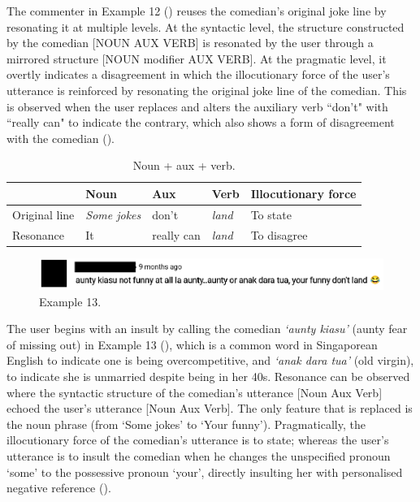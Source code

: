 \documentclass[english]{textolivre}
\begin{document}
The commenter in Example 12 () reuses the comedian’s original joke line by resonating it at multiple levels. At the syntactic level, the structure constructed by the comedian [NOUN AUX VERB] is resonated by the user through a mirrored structure [NOUN modifier AUX VERB]. At the pragmatic level, it overtly indicates a disagreement in which the illocutionary force of the user’s utterance is reinforced by resonating the original joke line of the comedian. This is observed when the user replaces and alters the auxiliary verb ``don’t" with ``really can" to indicate the contrary, which also shows a form of disagreement with the comedian ().

\begin{table}[h!]
\centering
\begin{threeparttable}
\caption{Noun + aux + verb.}\label{tab-5}
\begin{tabular}{lllll}
\toprule
& Noun & Aux & Verb & Illocutionary force \\
\midrule
Original line & \emph{Some jokes} & don’t & \emph{land} & To state \\
Resonance & It & really can & \emph{land} & To disagree \\
\bottomrule
\end{tabular}
\end{threeparttable}
\end{table}

\begin{figure}[h!]
    \centering
    \begin{minipage}{0.80\linewidth}
    \includegraphics[width=\linewidth]{imagens/exemplo13.png}
    \caption{Example 13.}\label{example-13}
    \end{minipage}
\end{figure}


The user begins with an insult by calling the comedian \textit{‘aunty kiasu’} (aunty fear of missing out) in Example 13 (), which is a common word in Singaporean English to indicate one is being overcompetitive, and \textit{‘anak dara tua’} (old virgin), to indicate she is unmarried despite being in her 40s. Resonance can be observed where the syntactic structure of the comedian’s utterance [Noun Aux Verb] echoed the user’s utterance [Noun Aux Verb]. The only feature that is replaced is the noun phrase (from ‘Some jokes’ to ‘Your funny’). Pragmatically, the illocutionary force of the comedian’s utterance is to state; whereas the user’s utterance is to insult the comedian when he changes the unspecified pronoun ‘some’ to the possessive pronoun ‘your’, directly insulting her with personalised negative reference (). 
\end{document}
